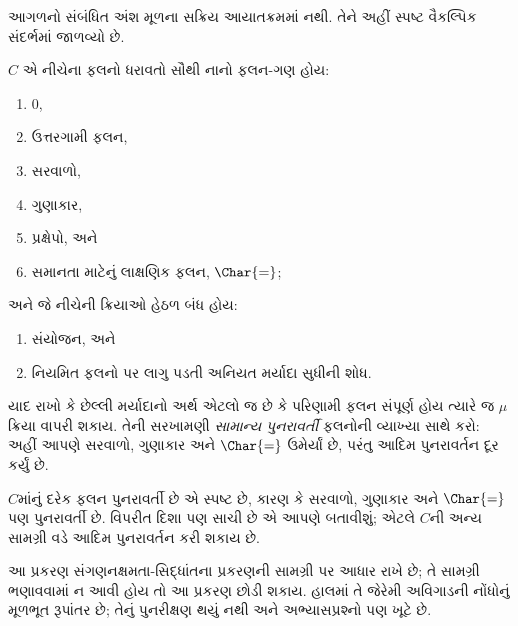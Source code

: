 \begin{editorial}
આગળનો સંબંધિત અંશ મૂળના સક્રિય આયાતક્રમમાં નથી. તેને અહીં સ્પષ્ટ વૈકલ્પિક સંદર્ભમાં જાળવ્યો છે.
\end{editorial}
\begingroup
\makeatletter{}\makeatother

\label{guunit:OLP-0648}


$C$ એ નીચેના ફલનો ધરાવતો સૌથી નાનો ફલન-ગણ હોય:
\begin{enumerate}
\item $0$,
\item ઉત્તરગામી ફલન,
\item સરવાળો,
\item ગુણાકાર,
\item પ્રક્ષેપો, અને
\item સમાનતા માટેનું લાક્ષણિક ફલન, $\Char{=}$;
\end{enumerate}
અને જે નીચેની ક્રિયાઓ હેઠળ બંધ હોય:
\begin{enumerate}
\item સંયોજન, અને
\item નિયમિત ફલનો પર લાગુ પડતી અનિયત મર્યાદા સુધીની શોધ.
\end{enumerate}
યાદ રાખો કે છેલ્લી મર્યાદાનો અર્થ એટલો જ છે કે
પરિણામી ફલન સંપૂર્ણ હોય ત્યારે જ $\mu$ ક્રિયા
વાપરી શકાય. તેની સરખામણી \emph{સામાન્ય પુનરાવર્તી}
ફલનોની વ્યાખ્યા સાથે કરો: અહીં આપણે સરવાળો, ગુણાકાર
અને $\Char{=}$ ઉમેર્યાં છે, પરંતુ આદિમ પુનરાવર્તન
દૂર કર્યું છે.

$C$માંનું દરેક ફલન પુનરાવર્તી છે એ સ્પષ્ટ છે,
કારણ કે સરવાળો, ગુણાકાર અને $\Char{=}$ પણ
પુનરાવર્તી છે. વિપરીત દિશા પણ સાચી છે એ આપણે
બતાવીશું; એટલે $C$ની અન્ય સામગ્રી વડે આદિમ
પુનરાવર્તન કરી શકાય છે.
\endgroup
\endgroup


\begingroup
\makeatletter{}\makeatother

\begin{editorial}
  આ પ્રકરણ સંગણનક્ષમતા-સિદ્ધાંતના
  પ્રકરણની સામગ્રી પર આધાર રાખે છે;
  તે સામગ્રી ભણાવવામાં ન આવી
  હોય તો આ પ્રકરણ છોડી શકાય.
  હાલમાં તે જેરેમી અવિગાડની
  નોંધોનું મૂળભૂત રૂપાંતર છે;
  તેનું પુનરીક્ષણ થયું નથી અને
  અભ્યાસપ્રશ્નો પણ ખૂટે છે.
\end{editorial}

\label{guunit:OLP-0301}


\begingroup
\makeatletter{}\makeatother

